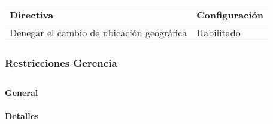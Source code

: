 \documentclass[
]{article}
\begin{document}
\begin{longtable}[]{@{}ll@{}}
\toprule
\textbf{Directiva} & \textbf{Configuración}\tabularnewline
\midrule
\endhead
Denegar el cambio de ubicación geográfica & Habilitado\tabularnewline
\bottomrule
\end{longtable}

\hypertarget{restricciones-gerencia}{%
\subsubsection{Restricciones Gerencia}\label{restricciones-gerencia}}

\hypertarget{section-10}{%
\subsection{}\label{section-10}}

\textbf{General}

\hypertarget{detalles-1}{%
\paragraph{Detalles}\label{detalles-1}}
\end{document}
